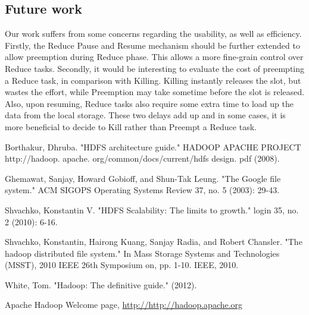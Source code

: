 \documentclass[runningheads,a4paper]{llncs}
\begin{document}
\subsection*{Future work}
Our work suffers from some concerns regarding the usability, as well as efficiency. Firstly, the Reduce Pause and Resume mechanism should be further extended to allow preemption during Reduce phase. This allows a more fine-grain control over Reduce tasks. Secondly, it would be interesting to evaluate the cost of preempting a Reduce task, in comparison with Killing. Killing instantly releases the slot, but wastes the effort, while Preemption may take sometime before the slot is released. Also, upon resuming, Reduce tasks also require some extra time to load up the data from the local storage. These two delays add up and in some cases, it is more beneficial to decide to Kill rather than Preempt a Reduce task.



\begin{thebibliography}{4}

 Borthakur, Dhruba. "HDFS architecture guide." HADOOP APACHE PROJECT http://hadoop. apache. org/common/docs/current/hdfs design. pdf (2008).

 Ghemawat, Sanjay, Howard Gobioff, and Shun-Tak Leung. "The Google file system." ACM SIGOPS Operating Systems Review 37, no. 5 (2003): 29-43.

 Shvachko, Konstantin V. "HDFS Scalability: The limits to growth." login 35, no. 2 (2010): 6-16.

 Shvachko, Konstantin, Hairong Kuang, Sanjay Radia, and Robert Chansler. "The hadoop distributed file system." In Mass Storage Systems and Technologies (MSST), 2010 IEEE 26th Symposium on, pp. 1-10. IEEE, 2010.

 White, Tom. "Hadoop: The definitive guide." (2012).

Apache Hadoop Welcome page, \url{http://http://hadoop.apache.org}

\end{thebibliography}
\end{document}
